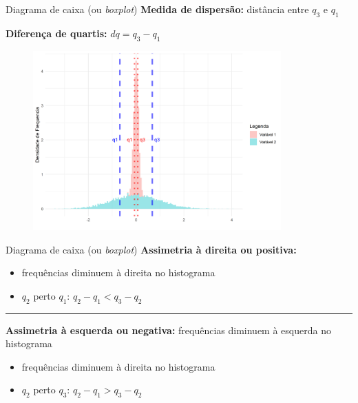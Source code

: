 \documentclass[
  10pt,
  ignorenonframetext,
]{beamer}
\providecommand{\tightlist}{%
  \setlength{\itemsep}{0pt}\setlength{\parskip}{0pt}}\usepackage{longtable,booktabs,array}
\newcommand*{\regrafina}{\rule{\textwidth}{0.5pt}}
\begin{document}
\begin{frame}{Diagrama de caixa (ou \emph{boxplot})}
\protect\hypertarget{diagrama-de-caixa-ou-boxplot-1}{}
\textbf{Medida de dispersão:} distância entre \(q_3\) e \(q_1\)

\textbf{Diferença de quartis:} \(dq = q_3 - q_1\)

\begin{figure}

{\centering \includegraphics[width=0.85\textwidth,height=\textheight]{motivacao_dq.png}

}

\end{figure}
\end{frame}

\begin{frame}{Diagrama de caixa (ou \emph{boxplot})}
\protect\hypertarget{diagrama-de-caixa-ou-boxplot-2}{}
\textbf{Assimetria à direita ou positiva:}

\begin{itemize}
\tightlist
\item
  frequências diminuem à direita no histograma
\item
  \(q_2\) perto \(q_1\): \(q_2 - q_1 < q_3 - q_2\)
\end{itemize}

\regrafina

\textbf{Assimetria à esquerda ou negativa:} frequências diminuem à
esquerda no histograma

\begin{itemize}
\tightlist
\item
  frequências diminuem à direita no histograma
\item
  \(q_2\) perto \(q_3\): \(q_2 - q_1 > q_3 - q_2\)
\end{itemize}
\end{frame}
\end{document}
